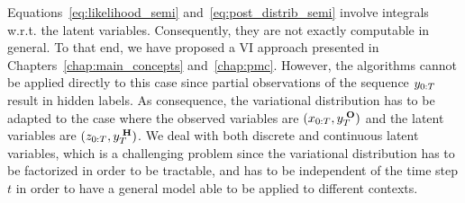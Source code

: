 Equations~\eqref{eq:likelihood_semi} and~\eqref{eq:post_distrib_semi}
involve integrals w.r.t. the latent variables.
Consequently, they are not exactly computable in general. 
To that end, we have proposed a VI approach
presented in Chapters~\ref{chap:main_concepts}
and~\ref{chap:pmc}.
However, the algorithms cannot be applied directly to this case 
since partial observations of the
sequence $y_{0:T}$ result in hidden labels.
As consequence, the variational distribution has to be adapted 
to the case where the observed variables are 
$(x_{0:T}, y_{T}^{\;\mathbf{O}})$
and the latent variables are $(z_{0:T}, y_{T}^{\;\mathbf{H}})$.
We deal with both discrete and continuous latent variables,
which is a challenging problem since the variational distribution
has to be factorized in order to be tractable, and 
has to be independent of the time step $t$ 
in order to have a general
model able to be applied to different contexts.



    


